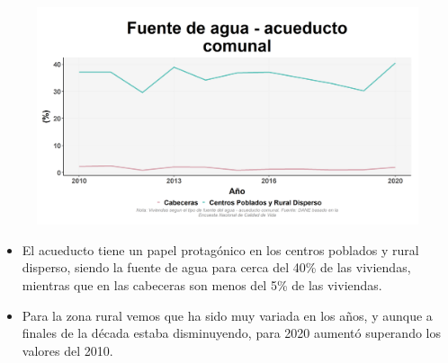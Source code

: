     \begin{figure}[H]
        \caption[Acueducto comunal como fuentes de agua por zonas ]{\label{cueducto_comunal_zonas} }
        \begin{center}
        \includegraphics[width=\textwidth,keepaspectratio]{img/var_134_trend.png}
        \end{center}
    \end{figure}
            \begin{itemize}
                    \item El acueducto tiene un papel protagónico en los centros poblados y rural disperso, siendo la fuente de agua para cerca del 40\% de las viviendas, mientras que en las cabeceras son menos del 5\% de las viviendas.
                    \item Para la zona rural vemos que ha sido muy variada en los años, y aunque a finales de la década estaba disminuyendo, para 2020 aumentó superando los valores del 2010.
                    \end{itemize}

